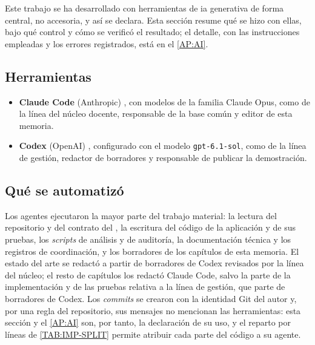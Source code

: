 
Este trabajo se ha desarrollado con herramientas de \acs{ia} generativa de forma central, no
accesoria, y así se declara. Esta sección resume qué se hizo con ellas, bajo qué control y
cómo se verificó el resultado; el detalle, con las instrucciones empleadas y los errores
registrados, está en el \cref{AP:AI}.

\subsection{Herramientas}

\begin{itemize}
  \item \textbf{Claude Code} (Anthropic) \cite{claude_code_docs}, con modelos de la familia
        Claude Opus, como  de la línea del núcleo docente, responsable de la
        base común y editor de esta memoria.
  \item \textbf{Codex} (OpenAI) \cite{openai_codex}, configurado con el modelo
        \texttt{gpt-6.1-sol}, como  de la línea de gestión, redactor de
        borradores y responsable de publicar la demostración.
\end{itemize}

\subsection{Qué se automatizó}

Los agentes ejecutaron la mayor parte del trabajo material: la lectura del repositorio y del
contrato del , la escritura del código de la aplicación y de sus pruebas, los
\textit{scripts} de análisis y de auditoría, la documentación técnica y los registros de
coordinación, y los borradores de los capítulos de esta memoria. El estado del arte se
redactó a partir de borradores de Codex revisados por la línea del núcleo; el resto de
capítulos los redactó Claude Code, salvo la parte de la implementación y de las pruebas
relativa a la línea de gestión, que parte de borradores de Codex. Los \textit{commits} se crearon con la identidad Git del
autor y, por una regla del repositorio, sus mensajes no mencionan las herramientas: esta
sección y el \cref{AP:AI} son, por tanto, la declaración de su uso, y el reparto por líneas
de \cref{TAB:IMP-SPLIT} permite atribuir cada parte del código a su agente.

